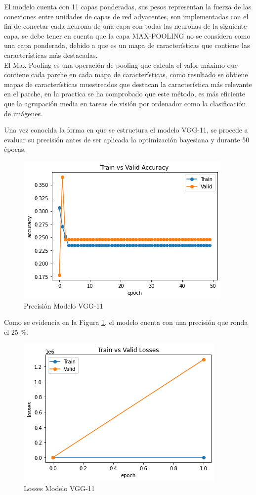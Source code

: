 			El modelo cuenta con 11 capas ponderadas, sus pesos representan la fuerza de las conexiones entre unidades de capas de red adyacentes, son implementadas con el fin de conectar cada neurona de una capa con todas las neuronas de la siguiente capa, se debe tener en cuenta que la capa MAX-POOLING no se considera como una capa ponderada, debido a que es un mapa de características que contiene las características más destacadas.\\
			
			 El Max-Pooling es una operación de pooling que calcula el valor máximo que contiene cada parche en cada mapa de características, como resultado se obtiene mapas de características muestreados que destacan la característica más relevante en el parche, en la practica se ha comprobado que este método, es más eficiente que la agrupación media en tareas de visión por ordenador como la clasificación de imágenes.
			 
			\newpage
			Una vez conocida la forma en que se estructura el modelo VGG-11, se procede a evaluar su precisión antes de ser aplicada la optimización bayesiana y durante 50 épocas.
			
			\begin{figure}[ht]
				\centering
				\includegraphics[scale=0.5]{Figs/105.png}
				\caption{Precisión Modelo VGG-11}
				\label{fig:precision_VGG11}
			\end{figure}
			
			Como se evidencia en la Figura \ref{fig:precision_VGG11}, el modelo cuenta con una precisión que ronda el 25 \%.
			\begin{figure}[ht]
				\centering
				\includegraphics[scale=0.5]{Figs/106.png}
				\caption{Losses Modelo VGG-11}
				\label{fig:loses_VGG11}
			\end{figure}
			
